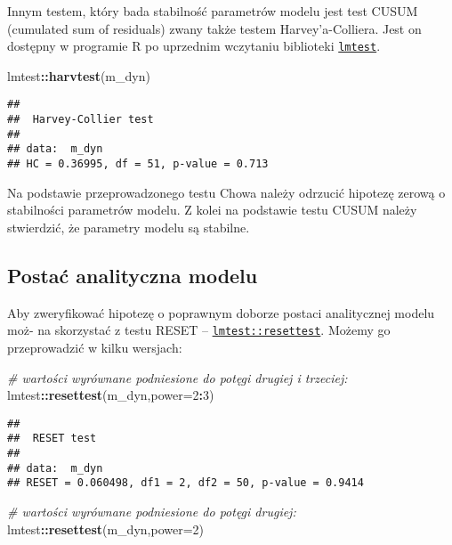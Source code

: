 \documentclass[polish,]{book}
\newenvironment{Shaded}{\begin{snugshade}}{\end{snugshade}}
\newcommand{\CommentTok}[1]{\textcolor[rgb]{0.56,0.35,0.01}{\textit{#1}}}
\newcommand{\DataTypeTok}[1]{\textcolor[rgb]{0.13,0.29,0.53}{#1}}
\newcommand{\DecValTok}[1]{\textcolor[rgb]{0.00,0.00,0.81}{#1}}
\newcommand{\KeywordTok}[1]{\textcolor[rgb]{0.13,0.29,0.53}{\textbf{#1}}}
\newcommand{\NormalTok}[1]{#1}
\newcommand{\OperatorTok}[1]{\textcolor[rgb]{0.81,0.36,0.00}{\textbf{#1}}}
\begin{document}
Innym testem, który bada stabilność parametrów modelu jest test CUSUM (cumulated sum of residuals) zwany także testem Harvey'a-Colliera. Jest on dostępny
w programie R po uprzednim wczytaniu biblioteki \href{https://rdrr.io/cran/lmtest/}{\texttt{lmtest}}.

\begin{Shaded}
\begin{Highlighting}[]
\NormalTok{lmtest}\OperatorTok{::}\KeywordTok{harvtest}\NormalTok{(m_dyn)}
\end{Highlighting}
\end{Shaded}

\begin{verbatim}
## 
##  Harvey-Collier test
## 
## data:  m_dyn
## HC = 0.36995, df = 51, p-value = 0.713
\end{verbatim}

Na podstawie przeprowadzonego testu Chowa należy odrzucić hipotezę zerową o stabilności parametrów modelu. Z kolei na podstawie testu CUSUM należy stwierdzić, że parametry modelu są stabilne.

\hypertarget{part_10.4.5}{%
\subsection{Postać analityczna modelu}\label{part_10.4.5}}

Aby zweryfikować hipotezę o poprawnym doborze postaci analitycznej modelu moż-
na skorzystać z testu RESET -- \href{https://rdrr.io/cran/lmtest/man/resettest.html}{\texttt{lmtest::resettest}}. Możemy go przeprowadzić w kilku wersjach:

\begin{Shaded}
\begin{Highlighting}[]
\CommentTok{# wartości wyrównane podniesione do potęgi drugiej i trzeciej:}
\NormalTok{lmtest}\OperatorTok{::}\KeywordTok{resettest}\NormalTok{(m_dyn,}\DataTypeTok{power=}\DecValTok{2}\OperatorTok{:}\DecValTok{3}\NormalTok{)}
\end{Highlighting}
\end{Shaded}

\begin{verbatim}
## 
##  RESET test
## 
## data:  m_dyn
## RESET = 0.060498, df1 = 2, df2 = 50, p-value = 0.9414
\end{verbatim}

\begin{Shaded}
\begin{Highlighting}[]
\CommentTok{# wartości wyrównane podniesione do potęgi drugiej:}
\NormalTok{lmtest}\OperatorTok{::}\KeywordTok{resettest}\NormalTok{(m_dyn,}\DataTypeTok{power=}\DecValTok{2}\NormalTok{)}
\end{Highlighting}
\end{Shaded}
\end{document}
